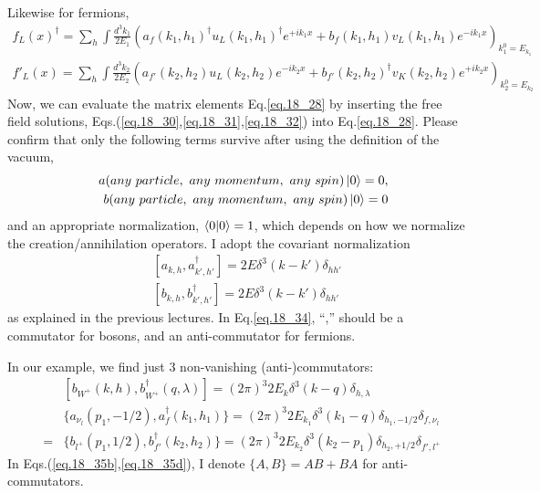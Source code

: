 \documentclass[12pt]{article}
\def\dgr{\dagger}
\def\lmd{\lambda}
\begin{document}
Likewise for fermions,
\begin{eqnarray}
    f_L(x)^\dgr
    = \sum_h \int \frac{d^3k_1}{2E_1}
    ( a_f(k_1,h_1)^\dgr u_L(k_1,h_1)^\dgr e^{+ik_1x}
    + b_f(k_1,h_1)      v_L(k_1,h_1)      e^{-ik_1x} )_{k_1^0=E_{k_1}} \label{eq.18_31}
\end{eqnarray}
\begin{eqnarray}
    f'_L(x)
= \sum_h \int \frac{d^3k_2}{2E_2}
( a_{f'}(k_2,h_2)    u_L(k_2,h_2) e^{-ik_2x}
+ b_{f'}(k_2,h_2)^\dgr v_K(k_2,h_2) e^{+ik_2x} )_{k_2^0=E_{k_2}}  \label{eq.18_32}
\end{eqnarray}
Now, we can evaluate the matrix elements Eq.\ref{eq.18_28} by inserting the free field solutions, Eqs.(\ref{eq.18_30},\ref{eq.18_31},\ref{eq.18_32}) into Eq.\ref{eq.18_28}. Please confirm that only the following terms survive after using the definition of the vacuum,
\begin{eqnarray}\label{eq.18_33}
&&a(any~particle,~any~momentum,~any~spin)\ket{0} = 0, \nonumber \\ 
&&b(any~particle,~any~momentum,~any~spin) \ket{0} = 0 
\end{eqnarray}
and an appropriate normalization, $\bra{0}\ket{0} = 1$, which depends on how we
normalize the creation/annihilation operators. I adopt the covariant
normalization
\begin{eqnarray}\label{eq.18_34}
&&[ a_{k,h}, a^\dagger_{k',h'} ] = 2E \delta^3(k - k') \delta_{hh'} \nonumber \\
&&[ b_{k,h}, b^\dagger_{k',h'} ] = 2E \delta^3(k - k') \delta_{hh'}
\end{eqnarray}
as explained in the previous lectures. In Eq.\ref{eq.18_34}, ``,'' should be a
commutator for bosons, and an anti-commutator for fermions.

In our example, we find just 3 non-vanishing (anti-)commutators:
\begin{eqnarray}
    &&[ b_{W^+}(k,h), b^\dagger_{W^+}(q,\lambda)]= (2\pi)^3 2E_k \delta^3(k-q) \delta_{h,\lmd}\label{eq.18_35a}\\ 
    &&\{ a_{\nu_l}(p_1,-1/2), a^\dagger_f(k_1,h_1) \}
    = (2\pi)^3 2E_{k_1} \delta^3(k_1-q) \delta_{h_1,-1/2} \delta_{f,\nu_l}\label{eq.18_35b} \\
    &=&  \{ b_{l^+}(p_1,1/2), b^\dagger_{f'}(k_2,h_2) \}
    = (2\pi)^3 2E_{k_2} \delta^3(k_2-p_1) \delta_{h_2,+1/2} \delta_{f',l^+}\label{eq.18_35d}
\end{eqnarray}
In Eqs.(\ref{eq.18_35b},\ref{eq.18_35d}), I denote $\{A,B\} = AB+BA$ for anti-commutators.
\end{document}
